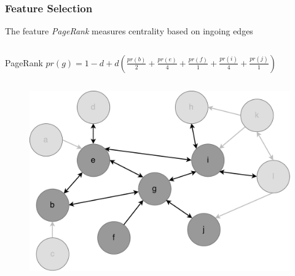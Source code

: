 \begin{frame}
\frametitle{Feature Selection}
The feature \textit{PageRank} measures centrality based on ingoing edges
\begin{columns}
\begin{column}{0.8\textwidth}\centering
	\begin{block}{\small PageRank}\centering
		$pr(g) = 1-d + d(\frac{pr(b)}{2}+\frac{pr(e)}{4} + \frac{pr(f)}{1} + \frac{pr(i)}{4} + \frac{pr(j)}{1})$
	\end{block}
\end{column}
\end{columns}
\begin{figure}
	\includegraphics[scale=0.32]{graphics/directed_network_example_pagerank.pdf}
\end{figure}

\end{frame}

